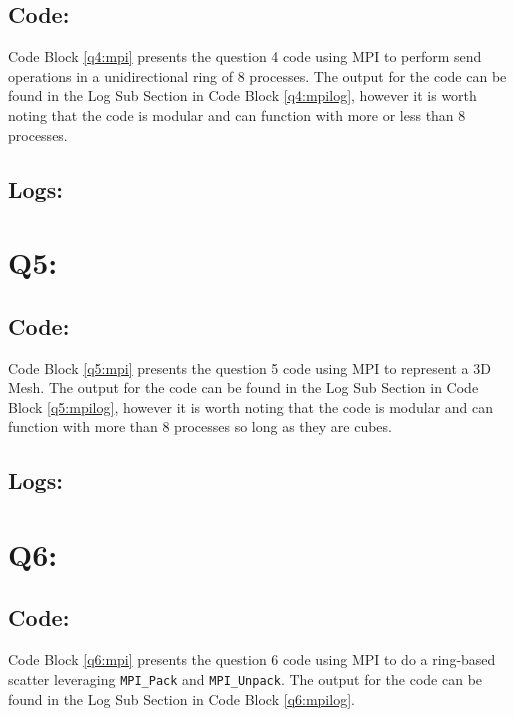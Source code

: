 \documentclass[11pt]{article}
\begin{document}
\subsection*{Code:}
Code Block \ref{q4:mpi} presents the question 4 code using MPI to perform send operations in a unidirectional ring of 8 processes.
The output for the code can be found in the Log Sub Section in Code Block \ref{q4:mpilog}, however it is worth noting that the code is modular and can function with more or less than 8 processes.



\subsection*{Logs:}


\section*{Q5:}

\subsection*{Code:}
Code Block \ref{q5:mpi} presents the question 5 code using MPI to represent a 3D Mesh.
The output for the code can be found in the Log Sub Section in Code Block \ref{q5:mpilog}, however it is worth noting that the code is modular and can function with more than 8 processes so long as they are cubes.



\subsection*{Logs:}


\section*{Q6:}

\subsection*{Code:}
Code Block \ref{q6:mpi} presents the question 6 code using MPI to do a ring-based scatter leveraging \texttt{MPI\_Pack} and \texttt{MPI\_Unpack}.
The output for the code can be found in the Log Sub Section in Code Block \ref{q6:mpilog}.
\end{document}
